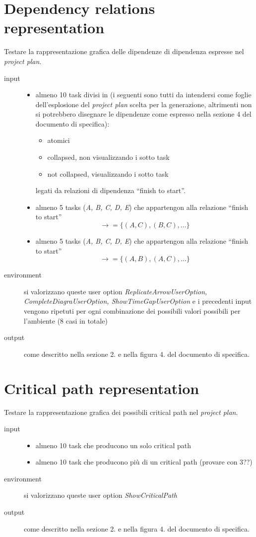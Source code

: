 \section{Dependency relations representation}
\label{sec:TNDependencyrepresentation}
Testare la rappresentazione grafica delle dipendenze di dipendenza espresse
nel \emph{project plan}.
\begin{description}
\item[input]  \quad
\begin{itemize}
  \item almeno 10 task divisi in (i seguenti sono tutti da intendersi come
  foglie dell'esplosione del \emph{project plan} scelta per la generazione,
  altrimenti non si potrebbero disegnare le dipendenze come espresso nella
  sezione 4 del documento di specifica):
  \begin{itemize}
  \item atomici
  \item collapsed, non visualizzando i sotto task
  \item not collapsed, visualizzando i sotto task 
  \end{itemize} legati da relazioni di dipendenza ``finish to start''.
  \item almeno 5 tasks (\emph{A, B, C, D, E}) che appartengon alla
relazione ``finish to start'' $$\rightarrow = \lbrace (A, C), (B, C), \ldots
\rbrace$$   
  \item almeno 5 tasks (\emph{A, B, C, D, E}) che appartengon alla
relazione ``finish to start'' $$\rightarrow = \lbrace (A, B), (A, C), \ldots
\rbrace$$
\end{itemize}
\item[environment] si valorizzano queste user option
\emph{ReplicateArrowUserOption, \\CompleteDiagraUserOption,
ShowTimeGapUserOption} e i precedenti input vengono ripetuti per ogni
combinazione dei possibili valori possibili per l'ambiente (8 casi in totale)
\item[output] come descritto nella sezione 2. e nella figura 4. del
documento di specifica.
\end{description}

\section{Critical path representation}
Testare la rappresentazione grafica dei possibili critical path
nel \emph{project plan}.
\begin{description}
\item[input]  \quad
\begin{itemize}
  \item almeno 10 task che producono un solo critical path
  \item almeno 10 task che producono pi\`u di un critical path (provare con 3??)
\end{itemize}
\item[environment] si valorizzano queste user option
\emph{ShowCriticalPath}
\item[output] come descritto nella sezione 2. e nella figura 4. del
documento di specifica.
\end{description}

